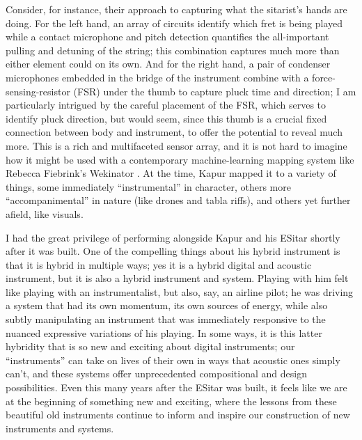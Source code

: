 Consider, for instance, their approach to capturing what the sitarist's hands are doing. For the left hand, an array of circuits identify which fret is being played while a contact microphone and pitch detection quantifies the all-important pulling and detuning of the string; this combination captures much more than either element could on its own. And for the right hand, a pair of condenser microphones embedded in the bridge of the instrument combine with a force-sensing-resistor (FSR) under the thumb to capture pluck time and direction; I am particularly intrigued by the careful placement of the FSR, which serves to identify pluck direction, but would seem, since this thumb is a crucial fixed connection between body and instrument, to offer the potential to reveal much more. This is a rich and multifaceted sensor array, and it is not hard to imagine how it might be used with a contemporary machine-learning mapping system like Rebecca Fiebrink's Wekinator \cite{Fiebrink:2009}. At the time, Kapur mapped it to a variety of things, some immediately ``instrumental'' in character, others more ``accompanimental'' in nature (like drones and tabla riffs), and others yet further afield, like visuals.


I had the great privilege of performing alongside Kapur and his ESitar shortly after it was built. One of the compelling things about his hybrid instrument is that it is hybrid in multiple ways; yes it is a hybrid digital and acoustic instrument, but it is also a hybrid instrument and system. Playing with him felt like playing with an instrumentalist, but also, say, an airline pilot; he was driving a system that had its own momentum, its own sources of energy, while also subtly manipulating an instrument that was immediately responsive to the nuanced expressive variations of his playing. In some ways, it is this latter hybridity that is so new and exciting about digital instruments; our ``instruments'' can take on lives of their own in ways that acoustic ones simply can't, and these systems offer unprecedented compositional and design possibilities. Even this many years after the ESitar was built, it feels like we are at the beginning of something new and exciting, where the lessons from these beautiful old instruments continue to inform and inspire our construction of new instruments and systems.

